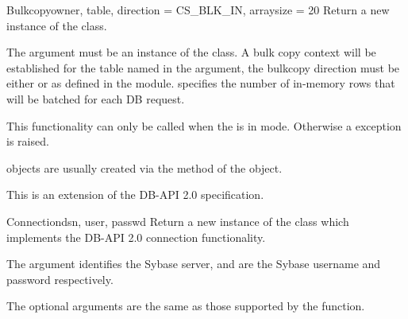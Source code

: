 \begin{classdesc}{Bulkcopy}{owner, table, direction = CS_BLK_IN, arraysize = 20}
Return a new instance of the  class.

The  argument must be an instance of the 
class.  A bulk copy context will be established for the table named in
the  argument, the bulkcopy direction must be either
 or  as defined in the
 module.   specifies the number of
in-memory rows that will be batched for each DB request.

This functionality can only be called when the  is
in  mode. Otherwise a 
exception is raised.

 objects are usually created via the
 method of the  object.

This is an extension of the DB-API 2.0 specification.
\end{classdesc}

\begin{classdesc}{Connection}{dsn, user, passwd \optional{, \ldots}}
Return a new instance of the  class which implements
the DB-API 2.0 connection functionality.

The  argument identifies the Sybase server,  and
 are the Sybase username and password respectively.

The optional arguments are the same as those supported by the
 function.
\end{classdesc}

